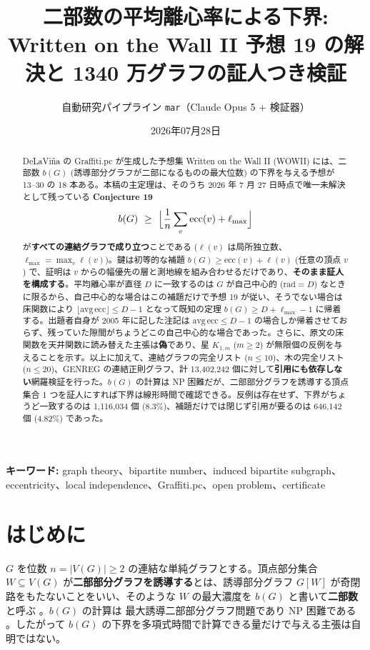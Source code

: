 \documentclass[paper=a4,fontsize=10.5pt,jafontsize=10.5pt]{jlreq}
\title{二部数の平均離心率による下界: Written on the Wall II 予想 19 の解決と 1340 万グラフの証人つき検証}
\author{自動研究パイプライン \texttt{mar}（Claude Opus 5 + 検証器）}
\date{2026年07月28日}
\theoremstyle{plain}
\theoremstyle{definition}
\begin{document}
\maketitle

\begin{abstract}
DeLaViña の Graffiti.pc が生成した予想集 Written on the Wall II (WOWII) には、二部数 $b(G)$ (誘導部分グラフが二部になるものの最大位数) の下界を与える予想が 13--30 の 18 本ある。本稿の主定理は、そのうち 2026 年 7 月 27 日時点で唯一未解決として残っている \textbf{Conjecture 19} \cite{wowii}
\[ b(G) \ \ge \ \Bigl\lfloor \frac{1}{n}\sum_{v} \mathrm{ecc}(v) + \ell_{\max} \Bigr\rfloor \]
が\textbf{すべての連結グラフで成り立つ}ことである ($\ell(v)$ は局所独立数、$\ell_{\max} = \max_v \ell(v)$)。鍵は初等的な補題 $b(G) \ge \mathrm{ecc}(v) + \ell(v)$ (任意の頂点 $v$) で、証明は $v$ からの幅優先の層と測地線を組み合わせるだけであり、\textbf{そのまま証人を構成する}。平均離心率が直径 $D$ に一致するのは $G$ が自己中心的 ($\mathrm{rad} = D$) なときに限るから、自己中心的な場合はこの補題だけで予想 19 が従い、そうでない場合は床関数により $\lfloor \mathrm{avg}\,\mathrm{ecc} \rfloor \le D-1$ となって既知の定理 $b(G) \ge D + \ell_{\max} - 1$ \cite{dw2004} に帰着する。出題者自身が 2005 年に記した注記は $\mathrm{avg}\,\mathrm{ecc} \le D - 1$ の場合しか帰着させておらず、残っていた隙間がちょうどこの自己中心的な場合であった。さらに、原文の床関数を天井関数に読み替えた主張は\textbf{偽}であり、星 $K_{1,m}$ ($m \ge 2$) が無限個の反例を与えることを示す。以上に加えて、連結グラフの完全リスト ($n \le 10$)、木の完全リスト ($n \le 20$)、GENREG の連結正則グラフ、計 13,402,242 個に対して\textbf{引用にも依存しない}網羅検証を行った。$b(G)$ の計算は NP 困難だが、二部部分グラフを誘導する頂点集合 1 つを証人にすれば下界は線形時間で確認できる。反例は存在せず、下界がちょうど一致するのは 1,116,034 個 (8.3\%)、補題だけでは閉じず引用が要るのは 646,142 個 (4.82\%) であった。
\end{abstract}

\noindent\textbf{キーワード:} graph theory、bipartite number、induced bipartite subgraph、eccentricity、local independence、Graffiti.pc、open problem、certificate


\section{はじめに}

$G$ を位数 $n = |V(G)| \ge 2$ の連結な単純グラフとする。頂点部分集合
$W \subseteq V(G)$ が\textbf{二部部分グラフを誘導する}とは、誘導部分グラフ
$G[W]$ が奇閉路をもたないことをいい、そのような $W$ の最大濃度を
$b(G)$ と書いて\textbf{二部数}と呼ぶ \cite{wowii}。$b(G)$ の計算は
最大誘導二部部分グラフ問題であり NP 困難である \cite{gj1979}。したがって
$b(G)$ の下界を多項式時間で計算できる量だけで与える主張は自明ではない。
\end{document}
